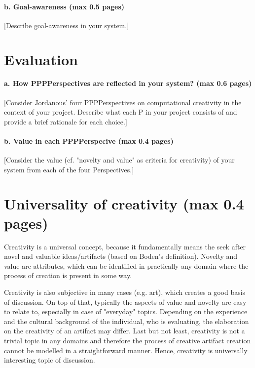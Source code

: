 \documentclass[english]{tktltiki}
\begin{document}
    \paragraph{b. Goal-awareness (max 0.5 pages)} 
    [Describe goal-awareness in your system.]
    
    
    
    \pagebreak
    \section{Evaluation}
    
    \paragraph{a. How PPPPerspectives are reflected in your system? (max 0.6 pages)}
    
    [Consider Jordanous' four PPPPerspectives on computational creativity in the context of your project. Describe what each P in your project consists of and provide a brief rationale for each choice.]
    
    \paragraph{b. Value in each PPPPerspecive (max 0.4 pages) }
    
    [Consider the value (cf. "novelty and value" as criteria for creativity) of your system from each of the four Perspectives.]
    
    \pagebreak
    \section{Universality of creativity (max 0.4 pages)}
    Creativity is a universal concept, because it fundamentally means the seek after novel and valuable ideas/artifacts (based on Boden's definition). Novelty and value are attributes, which can be identified in practically any domain where the process of creation is present in some way. 
    
    Creativity is also subjective in many cases (e.g. art), which creates a good basis of discussion. On top of that, typically the aspects of value and novelty are easy to relate to, especially in case of "everyday" topics. Depending on the experience and the cultural background of the individual, who is evaluating, the elaboration on the creativity of an artifact may differ. Last but not least, creativity is not a trivial topic in any domains and therefore the process of creative artifact creation cannot be modelled in a straightforward manner. Hence, creativity is universally interesting topic of discussion.
    
\end{document}
